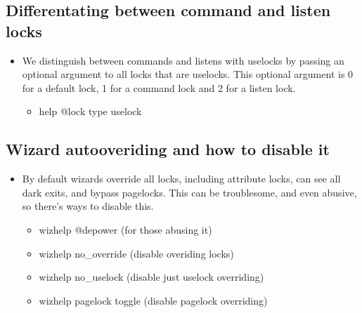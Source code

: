 \documentclass[letterpaper,10pt,english]{sphinxmanual}
\begin{document}
\subsection{Differentating between command and listen locks}
\label{\detokenize{features:differentating-between-command-and-listen-locks}}\begin{itemize}
\item {} 
\sphinxAtStartPar
We distinguish between commands and listens with uselocks by passing
an optional argument to all locks that are uselocks.  This optional
argument is 0 for a default lock, 1 for a command lock and 2 for
a listen lock.
\begin{itemize}
\item {} 
\sphinxAtStartPar
help @lock type uselock

\end{itemize}

\end{itemize}


\subsection{Wizard auto\sphinxhyphen{}overiding and how to disable it}
\label{\detokenize{features:wizard-auto-overiding-and-how-to-disable-it}}\begin{itemize}
\item {} 
\sphinxAtStartPar
By default wizards override all locks, including attribute locks,
can see all dark exits, and bypass pagelocks.  This can be
troublesome, and even abusive, so there’s ways to disable this.
\begin{itemize}
\item {} 
\sphinxAtStartPar
wizhelp @depower (for those abusing it)

\item {} 
\sphinxAtStartPar
wizhelp no\_override (disable overiding locks)

\item {} 
\sphinxAtStartPar
wizhelp no\_uselock (disable just uselock overriding)

\item {} 
\sphinxAtStartPar
wizhelp pagelock toggle (disable pagelock overriding)

\end{itemize}

\end{itemize}
\end{document}
